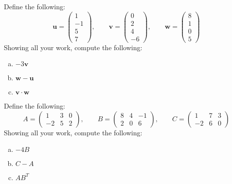 \documentclass[11pt,letterpaper]{article}
\begin{document}

 Define the following:
	\[
	\mathbf{u}= \begin{pmatrix} 1 \\ -1 \\ 5 \\ 7 \end{pmatrix}, \qquad
	\mathbf{v}= \begin{pmatrix} 0 \\ 2 \\ 4 \\ -6 \end{pmatrix}, \qquad
	\mathbf{w}= \begin{pmatrix} 8 \\ 1 \\ 0 \\5 \end{pmatrix}
	\]
Showing all your work, compute the following:
	\begin{enumerate}[(a)]
	\item $-3\mathbf{v}$
	\item $\mathbf{w} - \mathbf{u}$
	\item $\mathbf{v} \cdot \mathbf{w}$
	\end{enumerate}



\newpage



 Define the following:
	\[
	A= \begin{pmatrix} 1 & 3 & 0 \\ -2 & 5 & 2 \end{pmatrix}, \qquad
	B= \begin{pmatrix} 8 & 4 & -1 \\ 2 & 0 & 6 \end{pmatrix}, \qquad
	C= \begin{pmatrix} 1 & 7 & 3 \\ -2 & 6 & 0 \end{pmatrix}
	\]
Showing all your work, compute the following:
	\begin{enumerate}[(a)]
	\item $-4B$
	\item $C - A$
	\item $AB^T$
	\end{enumerate}



\newpage
\end{document}
